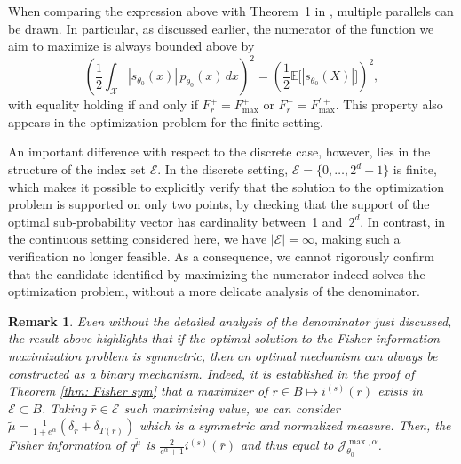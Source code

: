 \documentclass[a4paper, 11pt]{article}
\newtheorem{rem}{Remark}
\theoremstyle{definition}
\newcommand{\modar}{\color{black}}
\begin{document}
{When comparing the expression above with Theorem~1 in \cite{amorino2025factorization}, multiple parallels can be drawn. In particular, as discussed earlier, the numerator of the function we aim to maximize is always bounded above by
\[
\left( \frac{1}{2} \int_\mathcal{X} |s_{\theta_0}(x)| \, p_{\theta_0}(x) \, dx \right)^2
= \left( \frac{1}{2} \mathbb{E}\bigl[|s_{\theta_0}(X)|\bigr] \right)^2,
\]
with equality holding if and only if \( F_r^+ = F^+_{\max} \) or \( F_r^+ = F^{'+}_{\max} \). This property also appears in the optimization problem for the finite setting.  

An important difference with respect to the discrete case, however, lies in the structure of the index set \( \mathcal{E} \). In the discrete setting, \( \mathcal{E} = \{0, \dots, 2^d - 1\} \) is finite, which makes it possible to explicitly verify that the solution to the optimization problem is supported on only two points, by checking that the support of the optimal sub-probability vector has cardinality between~1 and~\( 2^d \). In contrast, in the continuous setting considered here, we have \( |\mathcal{E}| = \infty \), making such a verification no longer feasible. As a consequence, we cannot rigorously confirm that the candidate identified by maximizing the numerator indeed solves the optimization problem, without a more delicate analysis of the denominator.



\begin{rem}{\label{rem: 3}}
Even without the detailed analysis of the denominator just discussed, the result above highlights that if the optimal solution to the Fisher information maximization problem is symmetric, then an optimal mechanism can always be constructed as a binary mechanism. 
{\modar Indeed, it is established in the proof of Theorem \ref{thm: Fisher sym} that a maximizer of $r \in B\mapsto i^{(s)}(r)$ exists in $\mathcal{E}\subset B$. Taking $\bar{r}\in\mathcal{E}$ such maximizing value, we can consider $\tilde{\mu}=\frac{1}{1+e^{\alpha}} \left(\delta_{\bar{r}}+\delta_{T(\bar{r})}\right)$ which is a symmetric and normalized measure. Then, the Fisher information of $q^{\tilde{\mu}}$ is $\frac{2}{e^\alpha+1} i^{(s)}(\bar{r})$ and thus equal to $\mathcal{J}_{\theta_0}^{\max, \alpha}$.}
\end{rem}


}
\end{document}
